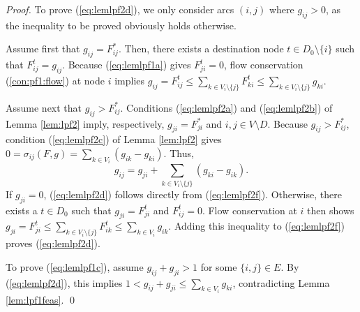 \begin{proof}
To prove (\ref{eq:lemlpf2d}), we only consider arcs $(i,j)$ where $g_{ij}>0$, as the inequality to be proved obviously holds otherwise.

Assume first that $g_{ij}=F_{ij}^*$.
Then, there exists a destination node $t\in D_0\setminus\{i\}$ such that $F_{ij}^t=g_{ij}$.
Because (\ref{eq:lemlpf1a}) gives $F_{ji}^t=0$, flow conservation (\ref{con:pf1:flow}) at node $i$ implies 
$g_{ij}=F_{ij}^t\leq \sum_{k\in V_i\setminus\{j\}}F_{ki}^t\leq \sum_{k\in V_i\setminus\{j\}}g_{ki}$.

Assume next that $g_{ij}>F_{ij}^*$.
Conditions (\ref{eq:lemlpf2a}) and (\ref{eq:lemlpf2b}) of Lemma \ref{lem:lpf2} imply, respectively,
$g_{ji}=F_{ji}^*$ and $i,j\in V\setminus D$.
Because $g_{ij}>F_{ij}^*$, 
condition (\ref{eq:lemlpf2c}) of Lemma \ref{lem:lpf2} gives
$0=\sigma_{ij}(F,g) = \sum_{k\in V_{i}}\left(g_{ik}-g_{ki}\right)$. Thus,
\begin{equation}
  g_{ij} = g_{ji} + \sum_{k\in V_{i}\setminus\{j\}}\left(g_{ki}-g_{ik}\right). \label{eq:lemlpf2f}
\end{equation}
If $g_{ji}=0$, (\ref{eq:lemlpf2d}) follows directly from (\ref{eq:lemlpf2f}).
Otherwise, there exists a $t\in D_0$ such that $g_{ji}=F_{ji}^t$ and $F_{ij}^t=0$.
Flow conservation at $i$ then shows $g_{ji}=F_{ji}^t\leq\sum_{k\in V_{i}\setminus\{j\}}F_{ik}^t\leq\sum_{k\in V_{i}}g_{ik}$.
Adding this inequality to (\ref{eq:lemlpf2f}) proves (\ref{eq:lemlpf2d}).

To prove (\ref{eq:lemlpf1c}), assume $g_{ij}+g_{ji}>1$ for some $\{i,j\}\in E$.
By (\ref{eq:lemlpf2d}), this implies $1<g_{ij}+g_{ji}\leq\sum_{k\in V_{i}}g_{ki}$, contradicting Lemma \ref{lem:lpf1feas}.
\qed\end{proof}


